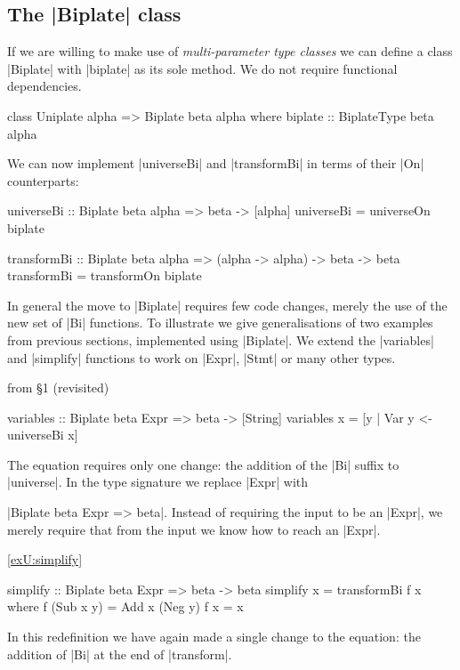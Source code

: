 \subsection{The |Biplate| class}

If we are willing to make use of \textit{multi-parameter type classes} \cite{jones:mptc} we can define a class |Biplate| with |biplate| as its sole method. We do not require functional dependencies.

\begin{code}
class  Uniplate alpha => Biplate beta alpha where
       biplate :: BiplateType beta alpha
\end{code}

We can now implement |universeBi| and |transformBi| in terms of their |On| counterparts:

\begin{code}
universeBi :: Biplate beta alpha => beta -> [alpha]
universeBi = universeOn biplate

transformBi :: Biplate beta alpha => (alpha -> alpha) -> beta -> beta
transformBi = transformOn biplate
\end{code}

In general the move to |Biplate| requires few code changes, merely the use of the new set of |Bi| functions. To illustrate we give generalisations of two examples from previous sections, implemented using |Biplate|. We extend the |variables| and |simplify| functions to work on |Expr|, |Stmt| or many other types.

\begin{exampleany}{from \S1 (revisited)}
\begin{code}
variables :: Biplate beta Expr => beta -> [String]
variables x = [y | Var y <- universeBi x]
\end{code}

The equation requires only one change: the addition of the |Bi| suffix to |universe|. In the type signature we replace |Expr| with \ignore|Biplate beta Expr => beta|. Instead of requiring the input to be an |Expr|, we merely require that from the input we know how to reach an |Expr|.
\end{exampleany}

\begin{examplerevisit}{\ref{exU:simplify}}
\begin{code}
simplify :: Biplate beta Expr => beta -> beta
simplify x = transformBi f x
    where  f (Sub x y)  = Add x (Neg y)
           f x          = x
\end{code}

In this redefinition we have again made a single change to the equation: the addition of |Bi| at the end of |transform|.
\end{examplerevisit}

